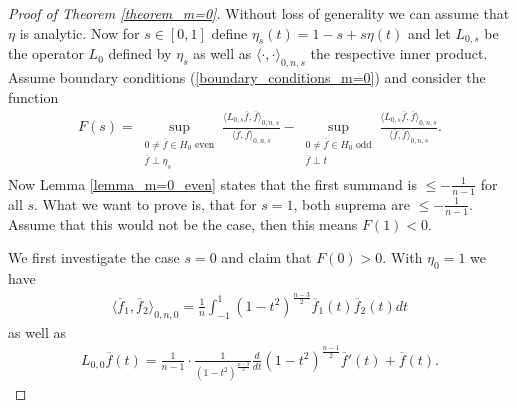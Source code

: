 \documentclass[12pt,twoside]{amsart}
\numberwithin{satz}{section}
\theoremstyle{definition}
\numberwithin{equation}{section}
\begin{document}
	\begin{proof}[Proof of Theorem \ref{theorem_m=0}]
		Without loss of generality we can assume that $\eta$ is analytic. Now for $s\in [0,1]$ define $\eta_s(t)=1-s+s\eta(t)$ and let $L_{0,s}$ be the operator $L_0$ defined by $\eta_s$ as well as $\langle\cdot,\cdot\rangle_{0,n,s}$ the respective inner product. Assume boundary conditions (\ref{boundary_conditions_m=0}) and consider the function
		\begin{align}\label{definition_F(s)}
			F(s)= \sup_{\substack{0\neq\overline{f}\in H_0 \text{ even}\\ \overline{f}\perp \eta_s}} \frac{\langle L_{0,s}\overline{f},\overline{f}\rangle_{0,n,s}}{\langle \overline{f},\overline{f}\rangle_{0,n,s}} - \sup_{\substack{0\neq\overline{f}\in H_0 \text{ odd}\\ \overline{f}\perp t}} \frac{\langle L_{0,s}\overline{f},\overline{f}\rangle_{0,n,s}}{\langle \overline{f},\overline{f}\rangle_{0,n,s}}.
		\end{align}
		Now Lemma \ref{lemma_m=0_even} states that the first summand is $\leq -\frac{1}{n-1}$ for all $s$. What we want to prove is, that for $s=1$, both suprema are $\leq -\frac{1}{n-1}$. Assume that this would not be the case, then this means $F(1)<0$. 
		
		We first investigate the case $s=0$ and claim that $F(0)>0$. With $\eta_0=1$ we have 
		\begin{align*}
			\langle \overline{f}_1,\overline{f}_2\rangle_{0,n,0}=\frac{1}{n}\int_{-1}^1 (1-t^2)^{\frac{n-3}{2}}\overline{f}_1(t)\overline{f}_2(t)dt
		\end{align*}
		as well as
		\begin{align*}
			L_{0,0}\overline{f}(t)=\frac{1}{n-1} \cdot  \frac{1}{(1-t^2)^{\frac{n-3}{2}}}\frac{d}{dt}(1-t^2)^{\frac{n-1}{2}}\overline{f}'(t)+\overline{f}(t).
		\end{align*}
		

\end{proof}
\end{document}
